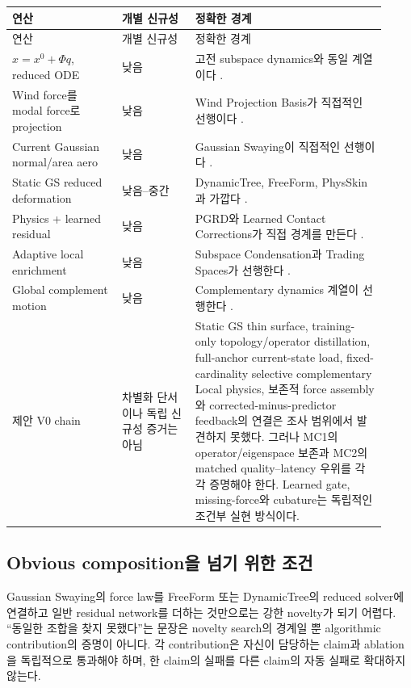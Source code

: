 \documentclass[11pt,a4paper]{article}
\begin{document}
\begin{longtable}{L{0.27\linewidth}L{0.18\linewidth}L{0.47\linewidth}}
\toprule
연산 & 개별 신규성 & 정확한 경계 \\
\midrule
\endfirsthead
\toprule
연산 & 개별 신규성 & 정확한 경계 \\
\midrule
\endhead
\(x=x^0+\Phi q\), reduced ODE & 낮음 & 고전 subspace dynamics와 동일 계열이다 \cite{barbic2005stvk}. \\
\addlinespace
Wind force를 modal force로 projection & 낮음 & Wind Projection Basis가 직접적인 선행이다 \cite{diener2009windbasis}. \\
\addlinespace
Current Gaussian normal/area aero & 낮음 & Gaussian Swaying이 직접적인 선행이다 \cite{yan2026gaussianswaying}. \\
\addlinespace
Static GS reduced deformation & 낮음--중간 & DynamicTree, FreeForm, PhysSkin과 가깝다 \cite{li2026dynamictree,xiang2026freeform,lei2026physskin}. \\
\addlinespace
Physics + learned residual & 낮음 & PGRD와 Learned Contact Corrections가 직접 경계를 만든다 \cite{patel2026pgrd,romero2021contact}. \\
\addlinespace
Adaptive local enrichment & 낮음 & Subspace Condensation과 Trading Spaces가 선행한다 \cite{teng2015condensation,trusty2024tradingspaces}. \\
\addlinespace
Global complement motion & 낮음 & Complementary dynamics 계열이 선행한다 \cite{benchekroun2023complementary}. \\
\addlinespace
제안 V0 chain & 차별화 단서이나 독립 신규성 증거는 아님 & Static GS thin surface, training-only topology/operator distillation, full-anchor current-state load, fixed-cardinality selective complementary Local physics, 보존적 force assembly와 corrected-minus-predictor feedback의 연결은 조사 범위에서 발견하지 못했다. 그러나 MC1의 operator/eigenspace 보존과 MC2의 matched quality--latency 우위를 각각 증명해야 한다. Learned gate, missing-force와 cubature는 독립적인 조건부 실현 방식이다. \\
\bottomrule
\end{longtable}

\subsection{Obvious composition을 넘기 위한 조건}

Gaussian Swaying의 force law를 FreeForm 또는 DynamicTree의 reduced solver에 연결하고
일반 residual network를 더하는 것만으로는 강한 novelty가 되기 어렵다.
``동일한 조합을 찾지 못했다''는 문장은 novelty search의 경계일 뿐 algorithmic contribution의 증명이 아니다.
각 contribution은 자신이 담당하는 claim과 ablation을 독립적으로 통과해야 하며,
한 claim의 실패를 다른 claim의 자동 실패로 확대하지 않는다.
\end{document}
